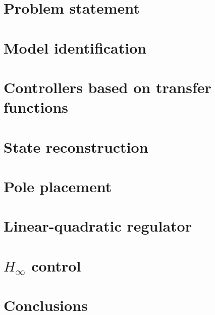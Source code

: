 \documentclass{report}
\begin{document}
	\chapter{Problem statement}
		
	\chapter{Model identification}
		
	\chapter{Controllers based on transfer functions}
		
	\chapter{State reconstruction}
		
	\chapter{Pole placement}
	  	
	\chapter{Linear-quadratic regulator}
		
	\chapter{\boldmath ${H_{\infty}}$ control}
		
	\chapter{Conclusions}
		
\end{document}
